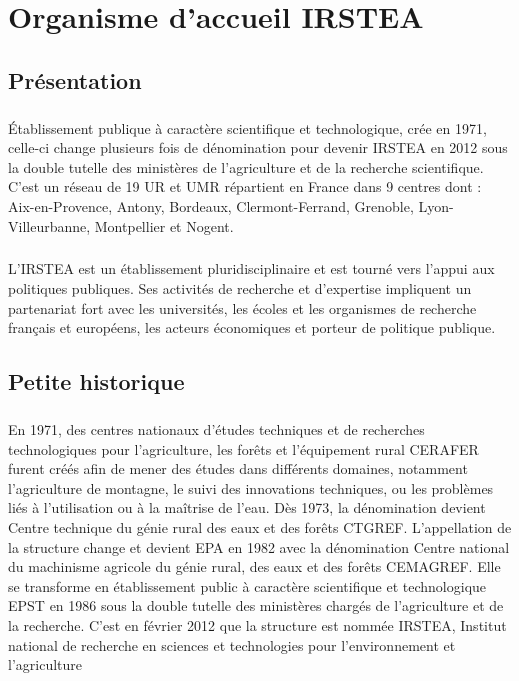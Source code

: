 \chapter{Organisme d’accueil IRSTEA}
\section{Présentation}
\paragraph{}
Établissement publique à caractère scientifique et technologique, crée en 1971, celle-ci change plusieurs fois de dénomination pour devenir \gls{IRSTEA}  en 2012 sous la double tutelle des ministères de l’agriculture et de la recherche scientifique. C’est  un réseau de 19 \gls{UR} et \gls{UMR} répartient en France dans 9 centres dont : Aix-en-Provence, Antony, Bordeaux, Clermont-Ferrand, Grenoble, Lyon-Villeurbanne, Montpellier et Nogent. 
\paragraph{}
L’IRSTEA est un établissement pluridisciplinaire et est tourné vers l’appui aux politiques publiques. Ses activités de recherche et d’expertise impliquent un partenariat fort avec les universités, les écoles et les organismes de recherche français et européens, les acteurs économiques et porteur de politique publique. 

\section{Petite historique}
\paragraph{}	
En 1971, des centres nationaux d’études techniques et de recherches technologiques pour l’agriculture, les forêts et l’équipement rural \gls{CERAFER} furent créés afin de mener des études dans différents domaines, notamment l’agriculture de montagne, le suivi des innovations techniques, ou les problèmes liés à l’utilisation ou à la maîtrise de l’eau. Dès 1973, la dénomination devient Centre technique du génie rural des eaux et des forêts \gls{CTGREF}.
\newline
L’appellation de la structure change et devient \gls{EPA} en 1982 avec la dénomination Centre national du machinisme agricole du génie rural, des eaux et des forêts \gls{CEMAGREF}. Elle se transforme en établissement public à caractère scientifique et technologique \gls{EPST} en 1986 sous la double tutelle des ministères chargés de l’agriculture et de la recherche. C’est en février 2012 que la structure est nommée IRSTEA, Institut national de recherche en sciences et technologies pour l’environnement et l’agriculture

